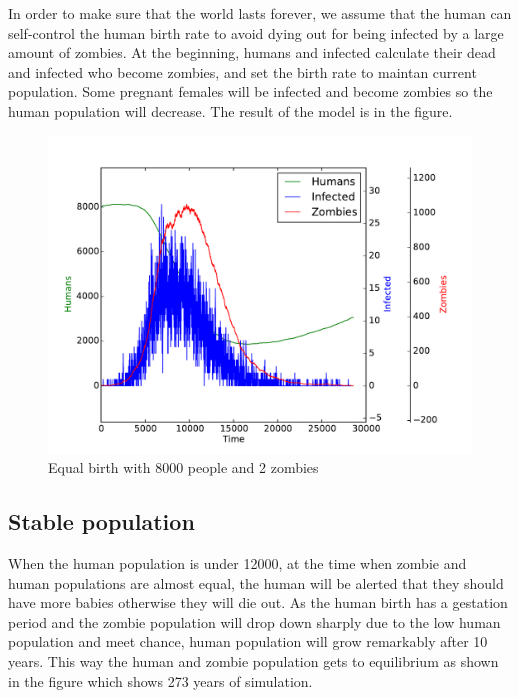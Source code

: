 \documentclass[a4paper]{article}
\begin{document}
In order to make sure that the world lasts forever, we assume that the human can self-control the human birth rate to avoid dying out for being infected by a large amount of zombies.
At the beginning, humans and infected calculate their dead and infected who become zombies, and set the birth rate to maintan current population.
Some pregnant females will be infected and become zombies so the human population will decrease.
The result of the model is in the figure.

\begin{figure}[pht]
    \centering
    \includegraphics[width=\textwidth]{equal_birth_8000}
    \caption{Equal birth with 8000 people and 2 zombies}
\end{figure}

\subsection{Stable population}

When the human population is under 12000, at the time when zombie and human populations are almost equal, the human will be alerted that they should have more babies otherwise they will die out.
As the human birth has a gestation period and the zombie population will drop down sharply due to the low human population and meet chance, human population will grow remarkably after 10 years. 
This way the human and zombie population gets to equilibrium as shown in the figure which shows 273 years of simulation.
\end{document}
